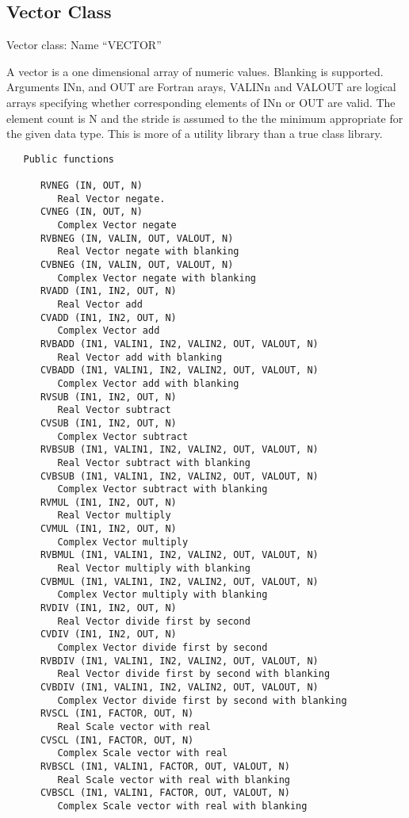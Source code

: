 \subsection{Vector Class}

   Vector class: Name ``VECTOR''

   A vector is a one dimensional array of numeric values.  Blanking is
supported.  Arguments INn, and OUT are Fortran arays, VALINn and VALOUT
are logical arrays specifying whether corresponding elements of INn or
OUT are valid.  The element count is N and the stride is assumed to
the the minimum appropriate for the given data type.  This is more of
a utility library than a true class library.
{\small\begin{verbatim}
   Public functions

      RVNEG (IN, OUT, N)
         Real Vector negate.
      CVNEG (IN, OUT, N)
         Complex Vector negate
      RVBNEG (IN, VALIN, OUT, VALOUT, N)
         Real Vector negate with blanking
      CVBNEG (IN, VALIN, OUT, VALOUT, N)
         Complex Vector negate with blanking
      RVADD (IN1, IN2, OUT, N)
         Real Vector add
      CVADD (IN1, IN2, OUT, N)
         Complex Vector add
      RVBADD (IN1, VALIN1, IN2, VALIN2, OUT, VALOUT, N)
         Real Vector add with blanking
      CVBADD (IN1, VALIN1, IN2, VALIN2, OUT, VALOUT, N)
         Complex Vector add with blanking
      RVSUB (IN1, IN2, OUT, N)
         Real Vector subtract
      CVSUB (IN1, IN2, OUT, N)
         Complex Vector subtract
      RVBSUB (IN1, VALIN1, IN2, VALIN2, OUT, VALOUT, N)
         Real Vector subtract with blanking
      CVBSUB (IN1, VALIN1, IN2, VALIN2, OUT, VALOUT, N)
         Complex Vector subtract with blanking
      RVMUL (IN1, IN2, OUT, N)
         Real Vector multiply
      CVMUL (IN1, IN2, OUT, N)
         Complex Vector multiply
      RVBMUL (IN1, VALIN1, IN2, VALIN2, OUT, VALOUT, N)
         Real Vector multiply with blanking
      CVBMUL (IN1, VALIN1, IN2, VALIN2, OUT, VALOUT, N)
         Complex Vector multiply with blanking
      RVDIV (IN1, IN2, OUT, N)
         Real Vector divide first by second
      CVDIV (IN1, IN2, OUT, N)
         Complex Vector divide first by second
      RVBDIV (IN1, VALIN1, IN2, VALIN2, OUT, VALOUT, N)
         Real Vector divide first by second with blanking
      CVBDIV (IN1, VALIN1, IN2, VALIN2, OUT, VALOUT, N)
         Complex Vector divide first by second with blanking
      RVSCL (IN1, FACTOR, OUT, N)
         Real Scale vector with real
      CVSCL (IN1, FACTOR, OUT, N)
         Complex Scale vector with real
      RVBSCL (IN1, VALIN1, FACTOR, OUT, VALOUT, N)
         Real Scale vector with real with blanking
      CVBSCL (IN1, VALIN1, FACTOR, OUT, VALOUT, N)
         Complex Scale vector with real with blanking
\end{verbatim}}

